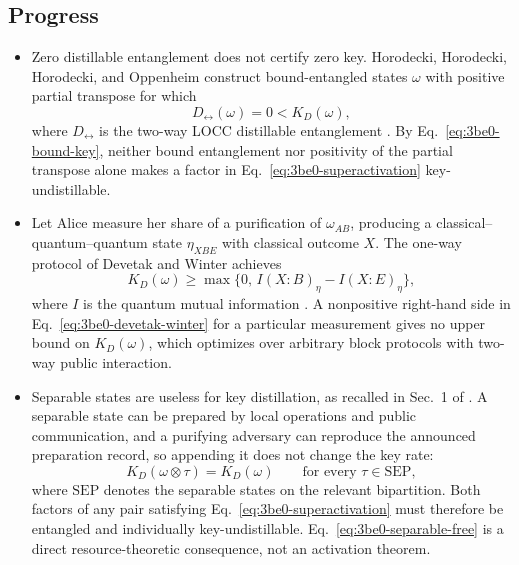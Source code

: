 \subsection*{Progress}

\begin{itemize}
  \item Zero distillable entanglement does not certify zero key.
  Horodecki, Horodecki, Horodecki, and Oppenheim construct bound-entangled
  states $\omega$ with positive partial transpose for which
  \begin{equation}
    D_{\leftrightarrow}(\omega)=0<K_D(\omega),
    \label{eq:3be0-bound-key}
  \end{equation}
  where $D_{\leftrightarrow}$ is the two-way LOCC distillable entanglement
  .  By Eq.~\eqref{eq:3be0-bound-key},
  neither bound entanglement nor positivity of the partial transpose alone
  makes a factor in Eq.~\eqref{eq:3be0-superactivation} key-undistillable.

  \item Let Alice measure her share of a purification of $\omega_{AB}$, producing
  a classical--quantum--quantum state $\eta_{XBE}$ with classical outcome $X$.
  The one-way protocol of Devetak and Winter achieves
  \begin{equation}
    K_D(\omega)\geq\max\{0,\,I(X:B)_\eta-I(X:E)_\eta\},
    \label{eq:3be0-devetak-winter}
  \end{equation}
  where $I$ is the quantum mutual information
  .  A nonpositive right-hand side in
  Eq.~\eqref{eq:3be0-devetak-winter} for a particular measurement gives no
  upper bound on $K_D(\omega)$, which optimizes over arbitrary block
  protocols with two-way public interaction.

  \item Separable states are useless for key distillation, as recalled in
  Sec.~1 of .  A separable state can be
  prepared by local operations and public communication, and a purifying
  adversary can reproduce the announced preparation record, so appending it
  does not change the key rate:
  \begin{equation}
    K_D(\omega\otimes\tau)=K_D(\omega)
    \qquad\text{for every }\tau\in\mathrm{SEP},
    \label{eq:3be0-separable-free}
  \end{equation}
  where $\mathrm{SEP}$ denotes the separable states on the relevant
  bipartition.  Both factors of any pair satisfying
  Eq.~\eqref{eq:3be0-superactivation} must therefore be entangled and
  individually key-undistillable.  Eq.~\eqref{eq:3be0-separable-free} is a
  direct resource-theoretic consequence, not an activation theorem.


\end{itemize}

